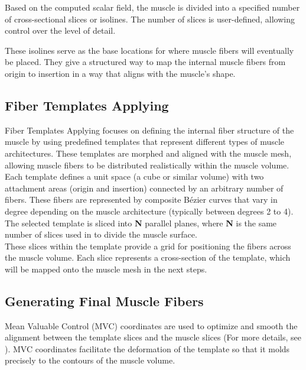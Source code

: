 \documentclass[english, bc, kiv, he, iso690alph, pdf, viewonly]{fasthesis}
\begin{document}
Based on the computed scalar field, the muscle is divided into a specified number of cross-sectional slices or isolines. The number of slices is user-defined, allowing control over the level of detail.

These isolines serve as the base locations for where muscle fibers will eventually be placed. They give a structured way to map the internal muscle fibers from origin to insertion in a way that aligns with the muscle’s shape.

\subsection{Fiber Templates Applying}
\label{subsec:kk_fiber_templates}

Fiber Templates Applying focuses on defining the internal fiber structure of the muscle by using predefined templates that represent different types of muscle architectures. These templates are morphed and aligned with the muscle mesh, allowing muscle fibers to be distributed realistically within the muscle volume. \\


Each template defines a unit space (a cube or similar volume) with two attachment areas (origin and insertion) connected by an arbitrary number of fibers. These fibers are represented by composite Bézier curves that vary in degree depending on the muscle architecture (typically between degrees 2 to 4). \\

The selected template is sliced into \textbf{N} parallel planes, where \textbf{N} is the same number of slices used in \textbf{} to divide the muscle surface.
\\

These slices within the template provide a grid for positioning the fibers across the muscle volume. Each slice represents a cross-section of the template, which will be mapped onto the muscle mesh in the next steps. 

\subsection{Generating Final Muscle Fibers}

Mean Valuable Control (MVC) coordinates are used to optimize and smooth the alignment between the template slices and the muscle slices (For more details, see \cite{HF06}). MVC coordinates facilitate the deformation of the template so that it molds precisely to the contours of the muscle volume.  \\
\end{document}
